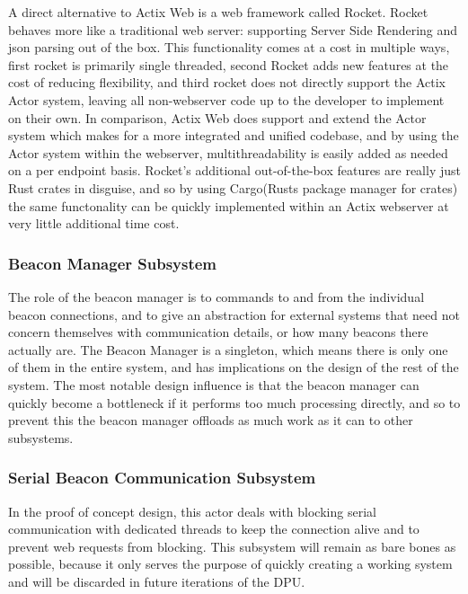 \bigskip
A direct alternative to Actix Web is a web framework called Rocket.
Rocket behaves more like a traditional web server: supporting \Gls{Server Side Rendering} and json parsing out of the box.
This functionality comes at a cost in multiple ways, first rocket is primarily single threaded, second Rocket adds new features at the cost of reducing flexibility, and third rocket does not directly support the Actix Actor system, leaving all non-webserver code up to the developer to implement on their own.
In comparison, Actix Web does support and extend the Actor system which makes for a more integrated and unified codebase, and by using the Actor system within the webserver, multithreadability is easily added as needed on a per endpoint basis.
Rocket's additional out-of-the-box features are really just Rust crates in disguise, and so by using Cargo(Rusts package manager for crates) the same functonality can be quickly implemented within an Actix webserver at very little additional time cost.

\medskip
\subsubsection{Beacon Manager Subsystem}
\medskip
The role of the beacon manager is to commands to and from the individual beacon connections, and to give an abstraction for external systems that need not concern themselves with communication details, or how many beacons there actually are.
The Beacon Manager is a singleton, which means there is only one of them in the entire system, and has implications on the design of the rest of the system.
The most notable design influence is that the beacon manager can quickly become a bottleneck if it performs too much processing directly, and so to prevent this the beacon manager offloads as much work as it can to other subsystems.

\medskip
\subsubsection{Serial Beacon Communication Subsystem}
\medskip
In the proof of concept design, this actor deals with blocking serial communication with dedicated threads to keep the connection alive and to prevent web requests from blocking.
This subsystem will remain as bare bones as possible, because it only serves the purpose of quickly creating a working system and will be discarded in future iterations of the DPU.

\pagebreak
